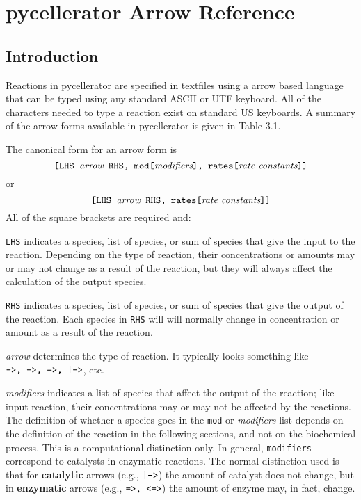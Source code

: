\chapter[Arrows]{pycellerator Arrow Reference}
\label{chapter:arrows}

\section{Introduction}

Reactions in pycellerator are specified in textfiles using a arrow based language that can be typed using any standard ASCII or UTF keyboard. All of the characters needed to type a reaction exist on standard US keyboards. A summary of the arrow forms available in pycellerator is given in Table 3.1. 

The canonical form for an arrow form  is 
\begin{equation*}
{\text{\tt[LHS {\rm{\it arrow}} RHS, mod[{\rm {\it modifiers}}], rates[{\rm {\it rate constants}}]]}}
\end{equation*}
or
\begin{equation*}
{\text{\tt[LHS {\rm{\it arrow}} RHS, rates[{\rm {\it rate constants}}]]}}
\end{equation*}
All of the square brackets are required and:

{\tt LHS} indicates a species, list of species, or sum of species that give the input to the reaction. Depending on the type of reaction, their concentrations or amounts may or may not change as a result of the reaction, but they will always affect the calculation of the output species. 

{\tt RHS} indicates a species, list of species, or sum of species that give the output of the reaction. Each species in {\tt RHS} will will normally change in concentration or amount as a result of the reaction. 

{\it arrow} determines the type of reaction. It typically looks something like ${\text {\tt ->, -->, =>, |->}}$, etc. 

{\it modifiers} indicates a list of species that affect the output of the reaction; like input reaction, their concentrations may or may not be affected by the reactions. The definition of whether a species goes in the {\tt mod} or {\it modifiers} list depends on the definition of the reaction in the following sections, and not on the biochemical process. This is a computational distinction only. In general, {\tt modifiers} correspond to catalysts in enzymatic reactions. The normal distinction used is that for \textbf{catalytic} arrows  (e.g., ${\text {\tt |->}}$) the amount of catalyst does not change, but in \textbf{enzymatic} arrows  (e.g., ${\text {\tt =>, <=>}}$) the amount of enzyme may, in fact, change. 


